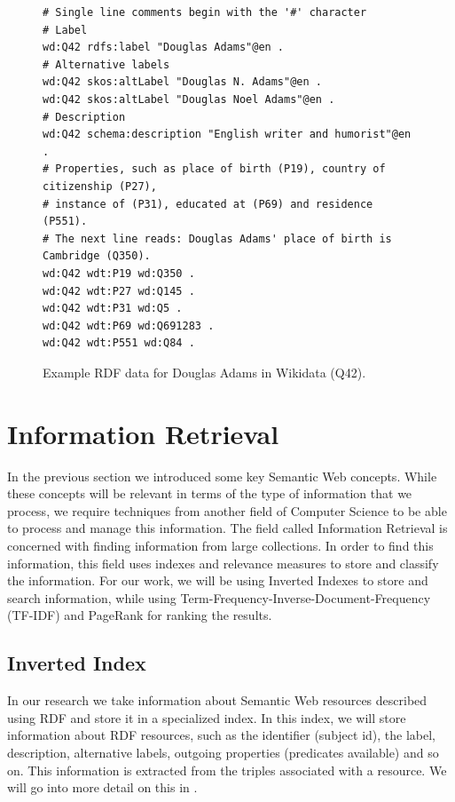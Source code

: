 \begin{figure}[H]
\begin{verbatim}
# Single line comments begin with the '#' character
# Label
wd:Q42 rdfs:label "Douglas Adams"@en . 
# Alternative labels
wd:Q42 skos:altLabel "Douglas N. Adams"@en .
wd:Q42 skos:altLabel "Douglas Noel Adams"@en .
# Description
wd:Q42 schema:description "English writer and humorist"@en .
# Properties, such as place of birth (P19), country of citizenship (P27), 
# instance of (P31), educated at (P69) and residence (P551).
# The next line reads: Douglas Adams' place of birth is Cambridge (Q350).
wd:Q42 wdt:P19 wd:Q350 .
wd:Q42 wdt:P27 wd:Q145 .
wd:Q42 wdt:P31 wd:Q5 .
wd:Q42 wdt:P69 wd:Q691283 .
wd:Q42 wdt:P551 wd:Q84 .
\end{verbatim}
\caption{Example RDF data for Douglas Adams in Wikidata (Q42).}
\label{fig:rdfDataExample}
\end{figure}


\section{Information Retrieval}

In the previous section we introduced some key Semantic Web concepts. While these concepts will be relevant in terms of the type of information that we process, we require techniques from another field of Computer Science to  be able to process and manage this information. The field called Information Retrieval is concerned with finding information from large collections. In order to find this information, this field uses indexes and relevance measures to store and classify the information. For our work, we will be using Inverted Indexes to store and search information, while using Term-Frequency-Inverse-Document-Frequency (TF-IDF) and PageRank for ranking the results.

\subsection{Inverted Index}
\label{chap:lucene}

In our research we take information about Semantic Web resources described using RDF and store it in a specialized index. In this index, we will store information about RDF resources, such as the identifier (subject id), the label, description, alternative labels, outgoing properties (predicates available) and so on. This information is extracted from the triples associated with a resource. We will go into more detail on this in .


